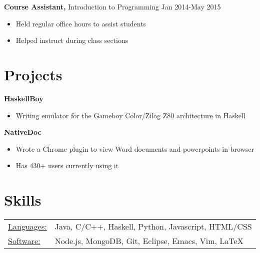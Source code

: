 \documentclass[margin]{res}
\begin{document}
\begin{resume}
                          {\bf Course Assistant,} Introduction to Programming \hfill Jan 2014-May 2015 \parskip -2pt
                          \begin{itemize} \itemsep -3pt
                          \item Held regular office hours to assist students
                          \item Helped instruct during class sections
                          \end{itemize}                              

                  \section{Projects}
                          {\bf HaskellBoy}
                          \begin{itemize} \itemsep -3pt
                          \item Writing emulator for the Gameboy Color/Zilog Z80 architecture in Haskell \smallskip
                          \end{itemize}
                          
                          {\bf NativeDoc}
                          \begin{itemize} \itemsep -3pt
                          \item Wrote a Chrome plugin to view Word documents and powerpoints in-browser
                          \item Has 430+ users currently using it
                          \end{itemize}
                  
                  \section{Skills}
                  \begin{tabular}{l p{3in}}
                    \underline{Languages:} & Java, C/C++, Haskell, Python, Javascript, HTML/CSS\\
                    \underline{Software:} &  Node.js, MongoDB, Git, Eclipse, Emacs, Vim, \LaTeX
                  \end{tabular}

\end{resume}
\end{document}
